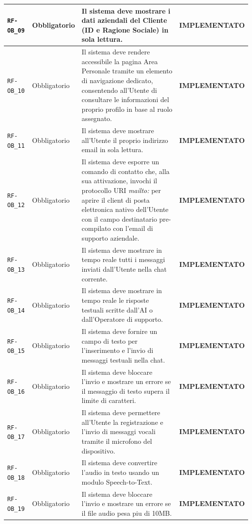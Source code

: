 \documentclass[a4paper, 11pt, oneside]{scrartcl}
\begin{document}
\begin{longtable}{|>{\raggedright\arraybackslash}p{}|>{\raggedright\arraybackslash}p{}|>{\raggedright\arraybackslash}p{}|>{\raggedright\arraybackslash}p{}|}
    \hline
    \texttt{RF-OB\_09} & Obbligatorio & Il sistema deve mostrare i dati aziendali del Cliente (ID e Ragione Sociale) in sola lettura. & \textbf{IMPLEMENTATO} \\
    \hline
    \texttt{RF-OB\_10} & Obbligatorio & Il sistema deve rendere accessibile la pagina Area Personale tramite un elemento di navigazione dedicato, consentendo all'Utente di consultare le informazioni del proprio profilo in base al ruolo assegnato. & \textbf{IMPLEMENTATO} \\
    \hline
    \texttt{RF-OB\_11} & Obbligatorio & Il sistema deve mostrare all'Utente il proprio indirizzo email in sola lettura. & \textbf{IMPLEMENTATO} \\
    \hline
    \texttt{RF-OB\_12} & Obbligatorio & Il sistema deve esporre un comando di contatto che, alla sua attivazione, invochi il protocollo URI \textit{mailto:} per aprire il client di posta elettronica nativo dell'Utente con il campo destinatario pre-compilato con l'email di supporto aziendale. & \textbf{IMPLEMENTATO} \\
    \hline
    \texttt{RF-OB\_13} & Obbligatorio & Il sistema deve mostrare in tempo reale tutti i messaggi inviati dall'Utente nella chat corrente. & \textbf{IMPLEMENTATO} \\
    \hline
    \texttt{RF-OB\_14} & Obbligatorio & Il sistema deve mostrare in tempo reale le risposte testuali scritte dall'AI o dall'Operatore di supporto. & \textbf{IMPLEMENTATO} \\
    \hline
    \texttt{RF-OB\_15} & Obbligatorio & Il sistema deve fornire un campo di testo per l'inserimento e l'invio di messaggi testuali nella chat. & \textbf{IMPLEMENTATO} \\
    \hline
    \texttt{RF-OB\_16} & Obbligatorio & Il sistema deve bloccare l'invio e mostrare un errore se il messaggio di testo supera il limite di caratteri. & \textbf{IMPLEMENTATO} \\
    \hline
    \texttt{RF-OB\_17} & Obbligatorio & Il sistema deve permettere all'Utente la registrazione e l'invio di messaggi vocali tramite il microfono del dispositivo. & \textbf{IMPLEMENTATO} \\
    \hline
    \texttt{RF-OB\_18} & Obbligatorio & Il sistema deve convertire l'audio in testo usando un modulo Speech-to-Text. & \textbf{IMPLEMENTATO} \\
    \hline
    \texttt{RF-OB\_19} & Obbligatorio & Il sistema deve bloccare l'invio e mostrare un errore se il file audio pesa piu di 10MB. & \textbf{IMPLEMENTATO} \\

\end{longtable}
\end{document}
